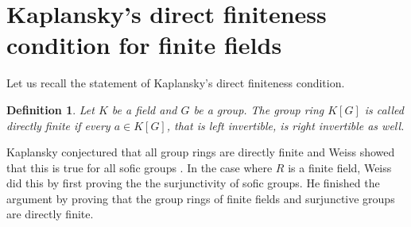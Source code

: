\documentclass[titlepage, a4paper]{article}
\newtheorem{definition}{Definition}
\theoremstyle{remark}
\begin{document}


	\section{Kaplansky's direct finiteness condition for finite fields}
	Let us recall the statement of Kaplansky's direct finiteness condition.
	\begin{definition}
		Let $K$ be a field and $G$ be a group. The group ring $K[G]$ is called directly finite if every  $a \in K[G]$, that is left invertible, is right invertible as well. 
	\end{definition}
	Kaplansky conjectured that all group rings are directly finite and Weiss showed that this is true for all sofic groups \cite{weiss_2000}. 
	In the case where $R$ is a finite field, Weiss did this by first proving the the surjunctivity of sofic groups.
	He finished the argument by proving that the group rings of finite fields and surjunctive groups are directly finite.  
\end{document}
